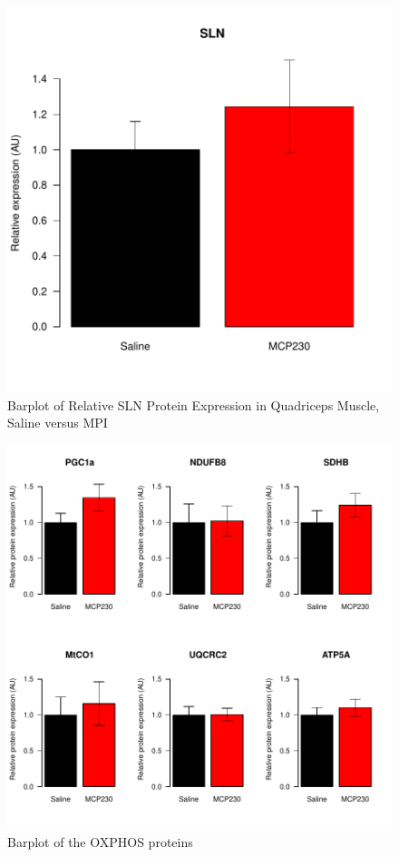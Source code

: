 \documentclass{article}
\begin{document}
\begin{figure}
\begin{center}
\includegraphics{2016-01-21_MitochondrialProteins-barplotSLN}
\end{center}
\caption{Barplot of Relative SLN Protein Expression in Quadriceps Muscle, Saline versus MPI}
\label{fig:barplotSLN}
\end{figure}

\begin{figure}
\begin{center}
\includegraphics{2016-01-21_MitochondrialProteins-barplot-combined}
\end{center}
\caption{Barplot of the OXPHOS proteins}
\label{fig:barplot-combined}
\end{figure}
\end{document}
